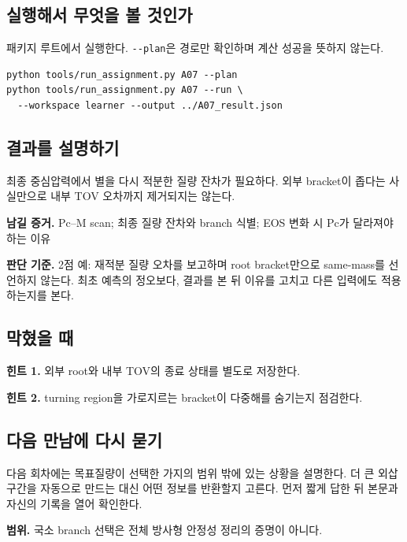 \documentclass[
  10pt,
  a4paper,
]{article}
\begin{document}
\newpage

\subsection{실행해서 무엇을 볼
것인가}\label{uxc2e4uxd589uxd574uxc11c-uxbb34uxc5c7uxc744-uxbcfc-uxac83uxc778uxac00}

패키지 루트에서 실행한다. \texttt{-\/-plan}은 경로만 확인하며 계산
성공을 뜻하지 않는다.

\begin{verbatim}
python tools/run_assignment.py A07 --plan
python tools/run_assignment.py A07 --run \
  --workspace learner --output ../A07_result.json
\end{verbatim}

\subsection{결과를
설명하기}\label{uxacb0uxacfcuxb97c-uxc124uxba85uxd558uxae30}

최종 중심압력에서 별을 다시 적분한 질량 잔차가 필요하다. 외부 bracket이
좁다는 사실만으로 내부 TOV 오차까지 제거되지는 않는다.

\textbf{남길 증거.} Pc--M scan; 최종 질량 잔차와 branch 식별; EOS 변화
시 Pc가 달라져야 하는 이유

\textbf{판단 기준.} 2점 예: 재적분 질량 오차를 보고하며 root
bracket만으로 same-mass를 선언하지 않는다. 최초 예측의 정오보다, 결과를
본 뒤 이유를 고치고 다른 입력에도 적용하는지를 본다.

\subsection{막혔을 때}\label{uxb9c9uxd614uxc744-uxb54c}

\textbf{힌트 1.} 외부 root와 내부 TOV의 종료 상태를 별도로 저장한다.

\textbf{힌트 2.} turning region을 가로지르는 bracket이 다중해를 숨기는지
점검한다.

\subsection{다음 만남에 다시
묻기}\label{uxb2e4uxc74c-uxb9ccuxb0a8uxc5d0-uxb2e4uxc2dc-uxbb3buxae30}

다음 회차에는 목표질량이 선택한 가지의 범위 밖에 있는 상황을 설명한다.
더 큰 외삽 구간을 자동으로 만드는 대신 어떤 정보를 반환할지 고른다. 먼저
짧게 답한 뒤 본문과 자신의 기록을 열어 확인한다.

\textbf{범위.} 국소 branch 선택은 전체 방사형 안정성 정리의 증명이
아니다.
\end{document}
